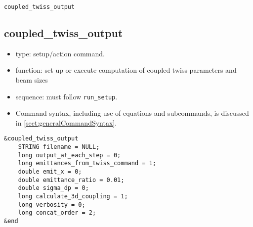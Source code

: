 \documentclass[11pt]{article}
\begin{document}
\newpage
\begin{center}{\Large\verb|coupled_twiss_output|}\end{center}
\subsection{coupled\_twiss\_output \label{subsec:coupledtwissoutput}}

\begin{itemize}
\item type: setup/action command.
\item function: set up or execute computation of coupled twiss parameters and beam sizes
\item sequence: must follow \verb|run_setup|.
\item Command syntax, including use of equations and subcommands, is discussed in \ref{sect:generalCommandSyntax}.
\end{itemize}

\begin{verbatim}
&coupled_twiss_output
    STRING filename = NULL;
    long output_at_each_step = 0;
    long emittances_from_twiss_command = 1;
    double emit_x = 0;
    double emittance_ratio = 0.01;
    double sigma_dp = 0;
    long calculate_3d_coupling = 1;
    long verbosity = 0;
    long concat_order = 2;
&end
\end{verbatim}
\end{document}
